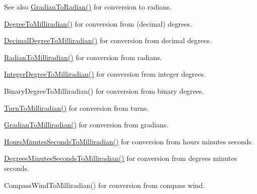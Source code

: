 \begin{DoxySeeAlso}{See also}
\mbox{\hyperlink{group___e_g_x_math-_conversions-_angle_conversions-_gradian_ga7ea0a6f47a672715b960181606c8fd7b}{Gradian\+To\+Radian()}} for conversion to radians. 

\mbox{\hyperlink{group___e_g_x_math-_conversions-_angle_conversions-_degree_gae4fa6c2d3805430760783650cfbfdb11}{Degree\+To\+Milliradian()}} for conversion from (decimal) degrees. 

\mbox{\hyperlink{group___e_g_x_math-_conversions-_angle_conversions-_decimal_degree_gab567d02d4692d9642a4ad219e479713a}{Decimal\+Degree\+To\+Milliradian()}} for conversion from decimal degrees. 

\mbox{\hyperlink{group___e_g_x_math-_conversions-_angle_conversions-_radian_gaea391f0cca39b05e298dd1cae162e7f1}{Radian\+To\+Milliradian()}} for conversion from radians. 

\mbox{\hyperlink{group___e_g_x_math-_conversions-_angle_conversions-_integer_degree_ga5379a68bdff5cc4fab5bb1ba06ef9453}{Integer\+Degree\+To\+Milliradian()}} for conversion from integer degrees. 

Binary\+Degree\+To\+Milliradian() for conversion from binary degrees. 

\mbox{\hyperlink{group___e_g_x_math-_conversions-_angle_conversions-_turn_ga2aea2621472294ce4c25ac7e55db51c6}{Turn\+To\+Milliradian()}} for conversion from turns. 

\mbox{\hyperlink{group___e_g_x_math-_conversions-_angle_conversions-_gradian_ga144f1019dc760268a163d81fcb3ce482}{Gradian\+To\+Milliradian()}} for conversion from gradians. 

\mbox{\hyperlink{group___e_g_x_math-_conversions-_angle_conversions-_hours_minutes_seconds_gad78a90abaed52ca9d5fe6b4287c4a5f3}{Hours\+Minutes\+Seconds\+To\+Milliradian()}} for conversion from hours minutes seconds. 

\mbox{\hyperlink{group___e_g_x_math-_conversions-_angle_conversions-_degrees_minutes_seconds_gacadb912be6af5dac1db702db86a69eeb}{Degrees\+Minutes\+Seconds\+To\+Milliradian()}} for conversion from degrees minutes seconds. 

Compass\+Wind\+To\+Milliradian() for conversion from compass wind. 
\end{DoxySeeAlso}
\mbox{\label{group___e_g_x_math-_conversions-_angle_conversions-_gradian_ga7ea0a6f47a672715b960181606c8fd7b}} 

